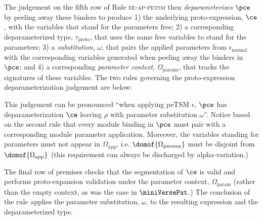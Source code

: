 \documentclass[acmlarge,review,anonymous]{acmart}\settopmatter{printfolios=true}
\begin{document}
The judgement on the fifth row of Rule \textsc{ee-ap-petsm} then \emph{deparameterizes} $\pce$ by peeling away these binders to produce 1) the underlying proto-expression, $\ce$, with the variables that stand for the parameters free; 2) a corresponding deparameterized type, $\tau_\text{proto}$, that uses the same free variables to stand for the parameters; 3) a \emph{substitution}, $\omega$, that pairs the applied parameters from $\epsilon_\text{normal}$ with the corresponding variables generated when peeling away the binders in $\pce$; and 4) a corresponding \emph{parameter context}, $\Omega_\text{params}$, that tracks the signatures of these variables. The two rules governing the proto-expression deparameterization judgement are below:
\begin{mathpar}

\end{mathpar}
This judgement can be pronounced ``when applying peTSM $\epsilon$, $\pce$ has deparameterization $\ce$ leaving $\rho$ with parameter substitution $\omega$''. 
Notice based on the second rule that every module binding in $\pce$ must pair with a corresponding module parameter application. Moreover, the variables standing for parameters must not appear in $\Omega_\text{app}$, i.e. $\domof{\Omega_\text{params}}$ must be disjoint from $\domof{\Omega_\text{app}}$ (this requirement can always be discharged by alpha-variation.)

The final row of premises checks that the segmentation of $\ce$ is valid and  performs proto-expansion validation under the parameter context, $\Omega_\text{param}$ (rather than the empty context, as was the case in $\miniVersePat$.) The conclusion of the rule applies the parameter substitution, $\omega$, to the resulting expression and the deparameterized type.
\end{document}
